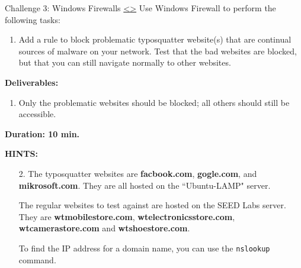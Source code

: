 \documentclass[12pt]{extarticle}
\newenvironment{instructionblock}{\Large\bgroup}{\egroup}
\newcommand{\ben}{\begin{enumerate}}
\newcommand{\een}{\end{enumerate}}
\begin{document}
\pagebreak
\begin{slide}{ Challenge 3: Windows Firewalls }{ \hyperref[slide 16]{\textless}\hyperref[slide 18]{\textgreater} }
\vskip 5pt
\begin{instructionblock}
	Use Windows Firewall to perform the following tasks:
	\begin{enumerate}
	\item{ Add a rule to block problematic typosquatter website(s) that are continual sources of malware on your network. Test that the bad websites are blocked, but that you can still navigate normally to other websites. }
	\end{enumerate}

\end{instructionblock}
\textbf{\Large{Deliverables:}}
\ben
\item Only the problematic websites should be blocked; all others should still be accessible.
\een

\vspace{20mm}
\begin{center}
	\textbf{\Large{Duration: 10 min.} }
\end{center}
\end{slide}


\vspace{8mm}
\noindent
\textbf{HINTS:}
\begin{enumerate}

\item[2.] The typosquatter websites are \textbf{facbook.com}, \textbf{gogle.com}, and \textbf{mikrosoft.com}. They are all hosted on the ``Ubuntu-LAMP" server.

The regular websites to test against are hosted on the SEED Labs server. They are \textbf{wtmobilestore.com}, \textbf{wtelectronicsstore.com}, \textbf{wtcamerastore.com} and \textbf{wtshoestore.com}.

To find the IP address for a domain name, you can use the \texttt{nslookup} command.

\end{enumerate}



\end{document}

